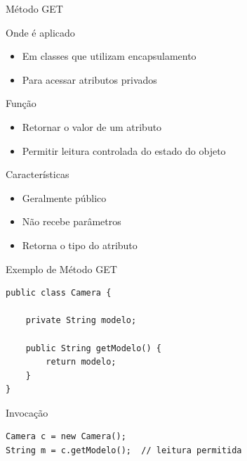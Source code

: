 \documentclass[9pt]{beamer}
\begin{document}
\begin{frame}{Método GET}

\begin{block}{Onde é aplicado}
\begin{itemize}
    \item Em classes que utilizam encapsulamento
    \item Para acessar atributos privados
\end{itemize}
\end{block}

\begin{block}{Função}
\begin{itemize}
    \item Retornar o valor de um atributo
    \item Permitir leitura controlada do estado do objeto
\end{itemize}
\end{block}

\begin{block}{Características}
\begin{itemize}
    \item Geralmente público
    \item Não recebe parâmetros
    \item Retorna o tipo do atributo
\end{itemize}
\end{block}

\end{frame}
\begin{frame}[fragile]{Exemplo de Método GET}

\begin{verbatim}
public class Camera {

    private String modelo;

    public String getModelo() {
        return modelo;
    }
}
\end{verbatim}

\begin{block}{Invocação}
\begin{verbatim}
Camera c = new Camera();
String m = c.getModelo();  // leitura permitida
\end{verbatim}
\end{block}
\end{frame}
\end{document}
